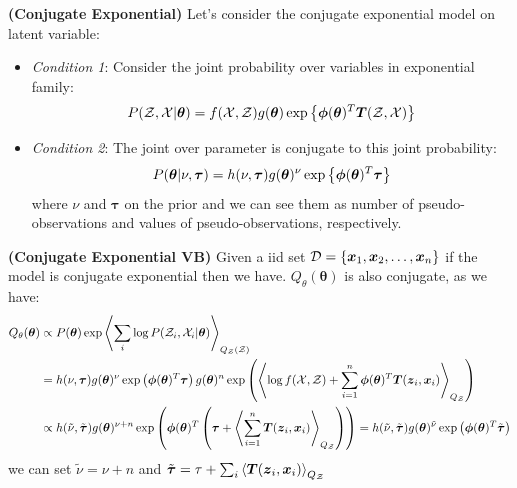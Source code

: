 \begin{remark}{\textbf{(Conjugate Exponential)}}
    Let's consider the conjugate exponential model on latent variable:
    \begin{itemize}
        \item \emph{Condition 1}: Consider the joint probability over variables in exponential family:
        \begin{equation*}
            P(\mathcal{Z},\mathcal{X}|\boldsymbol \theta) = f(\mathcal{X},\mathcal{Z})g(\boldsymbol \theta)\exp\left\{ \boldsymbol \phi(\boldsymbol \theta)^T\boldsymbol T(\mathcal{Z}, \mathcal{X}) \right\} 
        \end{equation*}
        \item \emph{Condition 2}: The joint over parameter is conjugate to this joint probability:
        \begin{equation*}
            P(\boldsymbol \theta | \nu, \boldsymbol \tau) = h(\nu, \boldsymbol \tau)g(\boldsymbol \theta)^\nu \exp\left\{ \boldsymbol \phi(\boldsymbol \theta)^T\boldsymbol \tau \right\}
        \end{equation*}
        where $\nu$ and $\boldsymbol \tau$ on the prior and we can see them as number of pseudo-observations and values of pseudo-observations, respectively.
    \end{itemize}
\end{remark}

\begin{remark}{\textbf{(Conjugate Exponential VB)}}
    Given a iid set $\mathcal{D} = \left\{ \boldsymbol x_1,\boldsymbol x_2,\dots,\boldsymbol x_n \right\}$  if the model is conjugate exponential then we have. $Q_\theta(\boldsymbol \theta)$ is also conjugate, as we have:
    \begin{equation*}
    \begin{aligned}
        Q_\theta(\boldsymbol \theta) &\propto P(\boldsymbol \theta)\exp\left\langle \sum_i \log P(\mathcal{Z}_i, \mathcal{X}_i | \boldsymbol \theta) \right\rangle_{Q_\mathcal{Z}(\mathcal{Z})} \\
        &= h(\nu, \boldsymbol \tau)g(\boldsymbol \theta)^\nu \exp\left( \boldsymbol \phi(\boldsymbol \theta)^T\boldsymbol \tau \right) g(\boldsymbol \theta)^n \exp\left(  \left\langle  \log f(\mathcal{X}, \mathcal{Z}) + \sum^n_{i=1} \boldsymbol \phi(\boldsymbol \theta)^T\boldsymbol T(\boldsymbol z_i, \boldsymbol x_i)  \right\rangle_{Q_\mathcal{Z}}  \right) \\
        &\propto h(\tilde{\nu}, \tilde{\boldsymbol \tau})g(\boldsymbol \theta)^{\nu + n} \exp\left(  \boldsymbol \phi(\boldsymbol \theta)^T \left(  \boldsymbol \tau + \left\langle \sum^n_{i=1} \boldsymbol T(\boldsymbol z_i, \boldsymbol x_i)  \right\rangle_{Q_\mathcal{Z}}  \right)  \right) = h(\tilde{\nu}, \tilde{\boldsymbol \tau})g(\boldsymbol \theta)^{\tilde{\nu}} \exp\left(  \boldsymbol \phi(\boldsymbol \theta)^T \tilde{\boldsymbol\tau}  \right)
    \end{aligned}
    \end{equation*}
    we can set $\tilde{\nu} = \nu + n$ and $\tilde{\boldsymbol \tau} = \tau + \sum_i \left\langle \boldsymbol T(\boldsymbol z_i, \boldsymbol x_i) \right\rangle_{Q_\mathcal{Z}}$
\end{remark}

